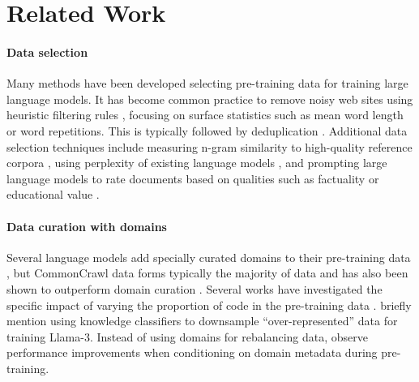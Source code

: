 \section{Related Work}

\paragraph{Data selection}
Many methods have been developed selecting pre-training data for training large language models. It has become common practice to remove noisy web sites using heuristic filtering rules \citep{raffel2020exploring, rae2021scaling, penedo2023refinedweb}, focusing on surface statistics such as mean word length or word repetitions. 
This is typically followed by deduplication \citep{lee2022deduplicating, jiang2023fuzzy, abbas2023semdedup, tirumala2023d4, soldaini-etal-2024-dolma}.
Additional data selection techniques include measuring n-gram similarity to high-quality reference corpora \citep{brown2020language, xie2023data, li2024datacomplm, brandfonbrener2024colorfilter}, using perplexity of existing language models \citep{wenzek2020ccnet, muennighoff2023scaling, marion2023more, ankner2025perplexed}, and prompting large language models to rate documents based on qualities such as factuality or educational value \citep{gunasekar2023textbooks, wettig2024qurating, sachdeva2024train, penedo2024finewebdatasetsdecantingweb}.

\vspace{-0.05in}
\paragraph{Data curation with domains}
Several language models add specially curated domains to their pre-training data \citep{touvron2023llama, soldaini-etal-2024-dolma, olmo20242}, but CommonCrawl data forms typically the majority of data and has also been shown to outperform domain curation \citep{penedo2023refinedweb, li2024datacomplm}.
Several works have investigated the specific impact of varying the proportion of code in the pre-training data \citep{ma2024at, petty2024does, viraat2025tocode, chen2025scaling}.
\citet{dubey2024llama} briefly mention using knowledge classifiers to downsample ``over-represented'' data for training Llama-3. 
Instead of using domains for rebalancing data, \citet{gao2025metadata} observe performance improvements when conditioning on domain metadata during pre-training.

\vspace{-0.05in}
